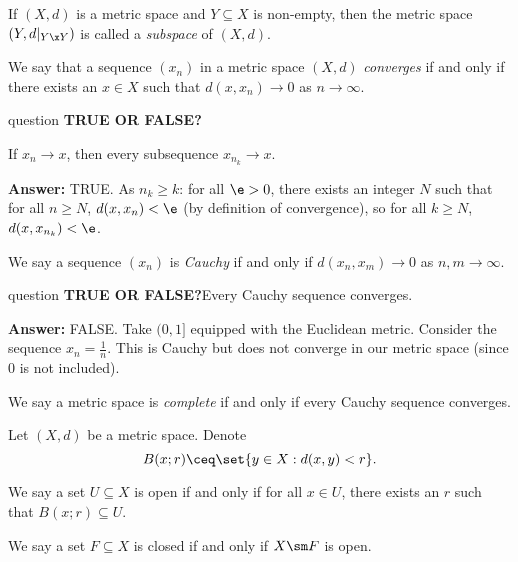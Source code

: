 \documentclass[class=article, crop=false]{standalone}
\begin{document}
\begin{defn}
  If $(X,d)$ is a metric space and $Y \subseteq X$ is non-empty, then the metric space $(Y, d|_{Y\x Y})$ is called a \emph{subspace} of $(X,d)$.
\end{defn}

\begin{defn}
  We say that a sequence $(x_n)$ in a metric space $(X,d)$ \emph{converges} if and only if there exists an $x \in X$ such that $d(x,x_n) \to 0$ as $n\to \infty$.
\end{defn}

\begin{understandingcheck}{question}
  \textbf{\textbf{TRUE OR FALSE?}}

  If $x_n \to x$, then every subsequence $x_{n_k} \to x$.

  \textbf{Answer:} TRUE. As $n_k \geq k$: for all $\e > 0$, there exists an integer $N$ such that for all $n \geq N$, $d(x,x_n) < \e$ (by definition of convergence), so for all $k \geq N$, $d(x,x_{n_k}) < \e$.
\end{understandingcheck}

\begin{defn}
  We say a sequence $(x_n)$ is \emph{Cauchy} if and only if $d(x_n,x_m) \to 0$ as $n,m\to \infty$.
\end{defn}

\begin{understandingcheck}{question}
  \textbf{TRUE OR FALSE?}Every Cauchy sequence converges.

  \textbf{Answer:} FALSE. Take $(0,1]$ equipped with the Euclidean metric. Consider the sequence $x_n = \frac{1}{n}$. This is Cauchy but does not converge in our metric space (since $0$ is not included).
\end{understandingcheck}

\begin{defn}
  We say a metric space is \emph{complete} if and only if every Cauchy sequence converges.
\end{defn}

\begin{defn}
  Let $(X,d)$ be a metric space. Denote
    \[
      B(x;r) \ceq \set{y \in X: d(x,y) < r}.
    \]

  We say a set $U \subseteq X$ is open if and only if for all $x \in U$, there exists an $r$ such that $B(x;r) \subseteq U$.

  We say a set $F \subseteq X$ is closed if and only if $X \sm F$ is open.
\end{defn}
\end{document}
